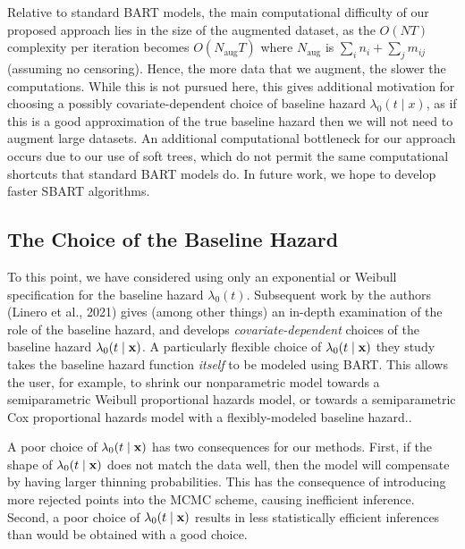 \documentclass[11pt]{article}
\newcommand{\bfx}{{\bf x}}
\begin{document}
Relative to standard BART models, the main computational difficulty of our proposed approach lies in the size of the augmented dataset, as the $O(NT)$ complexity per iteration becomes $O(N_{\text{aug}} T)$ where $N_{\text{aug}}$ is $\sum_i n_i + \sum_j m_{ij}$ (assuming no censoring). Hence, the more data that we augment, the slower the computations. While this is not pursued here, this gives additional motivation for choosing a possibly covariate-dependent choice of baseline hazard $\lambda_0(t \mid x)$, as if this is a good approximation of the true baseline hazard then we will not need to augment large datasets. 
An additional computational bottleneck for our approach occurs due to our use of soft trees, which do not permit the same computational shortcuts that standard BART models do. In future work, we hope to develop faster SBART algorithms.

\normalcolor

\subsection{The Choice of the Baseline Hazard}

\color{red}

To this point, we have considered using only an exponential or Weibull specification for the baseline hazard $\lambda_0(t)$. Subsequent work by the authors (Linero et al., 2021) gives (among other things) an in-depth examination of the role of the baseline hazard, and develops \emph{covariate-dependent} choices of the baseline hazard $\lambda_0(t \mid \bfx)$. A particularly flexible choice of $\lambda_0(t \mid \bfx)$ they study takes the baseline hazard function \emph{itself} to be modeled using BART. This allows the user, for example, to shrink our nonparametric model towards a semiparametric Weibull proportional hazards model, or towards a semiparametric Cox proportional hazards model with a flexibly-modeled baseline hazard..

A poor choice of $\lambda_0(t \mid \bfx)$ has two consequences for our methods. First, if the shape of $\lambda_0(t \mid \bfx)$ does not match the data well, then the model will compensate by having larger thinning probabilities. This has the consequence of introducing more rejected points into the MCMC scheme, causing inefficient inference. Second, a poor choice of $\lambda_0(t \mid \bfx)$ results in less statistically efficient inferences than would be obtained with a good choice.

\normalcolor
\end{document}
